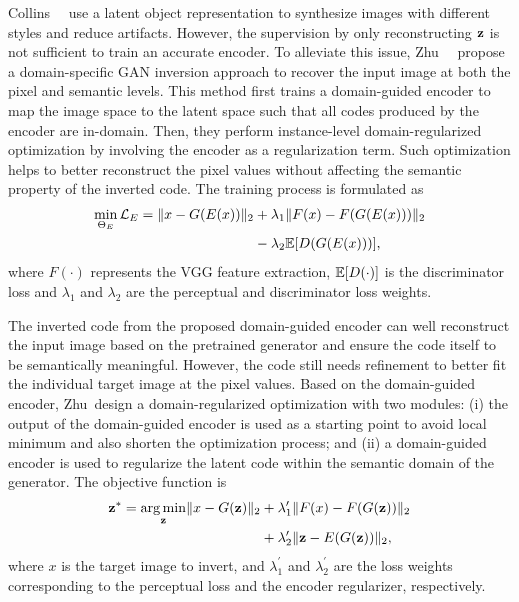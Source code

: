 Collins~\etal~\cite{collins2020uncovering} use a latent object representation to synthesize images with different styles and reduce artifacts.
However, the supervision by only reconstructing $\mathbf{z}$ is not sufficient to train an accurate encoder. 
To alleviate this issue, Zhu~\etal~\cite{zhu2020indomain} propose a domain-specific GAN inversion approach to recover the input image at both the pixel and semantic levels.
This method first trains a domain-guided encoder to map the image space to the latent space such that all codes produced by the encoder are in-domain. Then, they perform instance-level domain-regularized optimization by involving the encoder as a regularization term. Such optimization helps to better reconstruct the pixel values without affecting the semantic property of the inverted code.
The training process is formulated as
\begin{equation} 
\begin{aligned}
\min_{\Theta_{E}} \mathcal{L}_{E}=\|x-G(E(x))\|_{2} 
&+\lambda_1\|F(x)-F(G(E(x)))\|_{2} \\ 
&-\lambda_2 {\mathbb{E}}[D(G(E(x)))],
\end{aligned}
\end{equation} 
where $F(\cdot)$ represents the VGG feature extraction, $\mathbb{E}[D(\cdot)]$ is the discriminator loss and $\lambda_1$ and $\lambda_2$ are the perceptual and discriminator loss weights.

The inverted code from the proposed domain-guided encoder can well reconstruct the input image based on the pretrained generator and ensure the code itself to be semantically meaningful. However, the code still needs refinement to better fit the individual target image at the pixel values.
Based on the domain-guided encoder, Zhu~\etal design a domain-regularized optimization with two modules:
(i) the output of the domain-guided encoder is used as a starting point to avoid local minimum and also shorten the optimization process; and (ii) a domain-guided encoder
is used to regularize the latent code within the semantic domain of the generator. 
The objective function is
\begin{equation}
\begin{aligned}
\mathbf{z}^{*}=\underset{\mathbf{z}}{\arg \min }\|x-G(\mathbf{z})\|_{2} &+\lambda_1^{\prime}\|F(x)-F(G(\mathbf{z}))\|_{2} \\
&+\lambda_2^{\prime}\|\mathbf{z}-E(G(\mathbf{z}))\|_{2},
\end{aligned} 
\end{equation}
where $x$ is the target image to invert, and $\lambda_1^{\prime}$ and $\lambda_2^{\prime}$ are the loss weights corresponding to the perceptual loss and the encoder regularizer, respectively.

